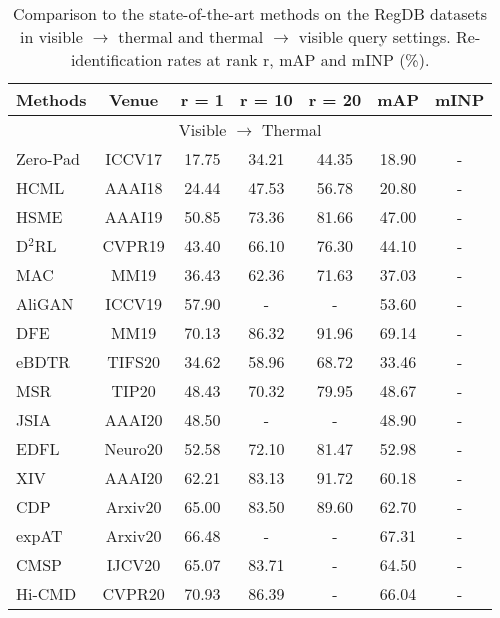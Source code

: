 \documentclass[journal]{IEEEtran}
\begin{document}
\begin{table}
\footnotesize
\caption{Comparison to the state-of-the-art methods on the RegDB datasets in visible $\rightarrow$ thermal and thermal $\rightarrow$ visible query settings. Re-identification rates at rank r, mAP and mINP (\%).}
\label{tab:sota_regdb}
  \centering
  \begin{tabular}{l|c|c|c|c|c|c}
    \toprule[2pt]
      Methods & Venue &   r = 1  & r = 10 & r = 20 & mAP & mINP    \\ \toprule[1pt]
      \multicolumn{7}{c}{Visible $\rightarrow$ Thermal} \\ \toprule[1pt]
      Zero-Pad \cite{wu2017rgb}& ICCV17 &  17.75 & 34.21 & 44.35 & 18.90 & -  \\
      HCML \cite{ye2018hierarchical} & AAAI18 & 24.44 & 47.53 & 56.78& 20.80 & -  \\ \hline
      HSME \cite{hao2019hsme} & AAAI19  & 50.85 & 73.36 & 81.66 & 47.00 & -  \\
      D$^2$RL \cite{wang2019learning1}& CVPR19  & 43.40 &66.10 &76.30 &44.10 & -  \\
      MAC \cite{Ye2019ModalityawareCL} & MM19 & 36.43 & 62.36 & 71.63 & 37.03 & -  \\
      AliGAN \cite{wang2019rgb} & ICCV19 & 57.90 & - & - & 53.60 & -  \\
      DFE \cite{Hao2019DualalignmentFE} &  MM19 & 70.13 & 86.32 & 91.96 & 69.14 & -  \\ \hline
      eBDTR \cite{Ye2020DeepLF} & TIFS20 & 34.62 & 58.96 & 68.72 & 33.46 &-  \\
      MSR \cite{Feng2020LearningMR} & TIP20 & 48.43 & 70.32 & 79.95 & 48.67 &-  \\
      JSIA \cite{Wang2020CrossModalityPG} & AAAI20 & 48.50 & - & - & 48.90 &-  \\
      EDFL \cite{liu2020enhancing} & Neuro20 & 52.58 & 72.10 & 81.47 & 52.98 & -  \\
      XIV \cite{Li2020InfraredVisibleCP} & AAAI20 & 62.21 & 83.13 & 91.72 & 60.18 &-  \\
      CDP \cite{Fan2020CrossSpectrumDP} & Arxiv20 & 65.00 & 83.50 & 89.60 & 62.70 &-  \\
      expAT \cite{Ye2020BidirectionalEA} & Arxiv20 & 66.48 & - & - & 67.31 &-  \\
      CMSP \cite{wu2020rgb} & IJCV20 & 65.07 & 83.71 & - & 64.50 &-  \\
      Hi-CMD \cite{choi2020hi} & CVPR20 & 70.93 & 86.39 & - & 66.04 & -   \\

\end{tabular}
\end{table}
\end{document}

